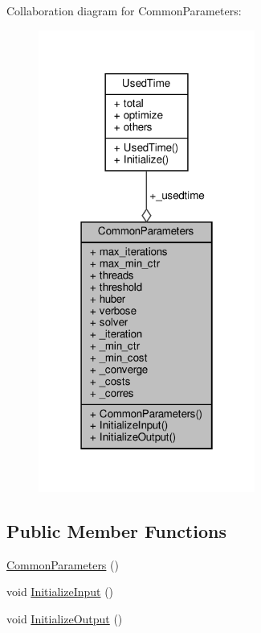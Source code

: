 Collaboration diagram for Common\+Parameters\+:\nopagebreak
\begin{figure}[H]
\begin{center}
\leavevmode
\includegraphics[width=202pt]{d0/df5/structCommonParameters__coll__graph}
\end{center}
\end{figure}
\subsection*{Public Member Functions}
\begin{DoxyCompactItemize}
\item 
\hyperlink{structCommonParameters_a71957c669b007409960c318b14918b92}{Common\+Parameters} ()
\item 
void \hyperlink{structCommonParameters_a31cc6bc70619791b6239a57baef5e7f1}{Initialize\+Input} ()
\item 
void \hyperlink{structCommonParameters_a4c459388b8c520c501e81afb0eecfc91}{Initialize\+Output} ()
\end{DoxyCompactItemize}
